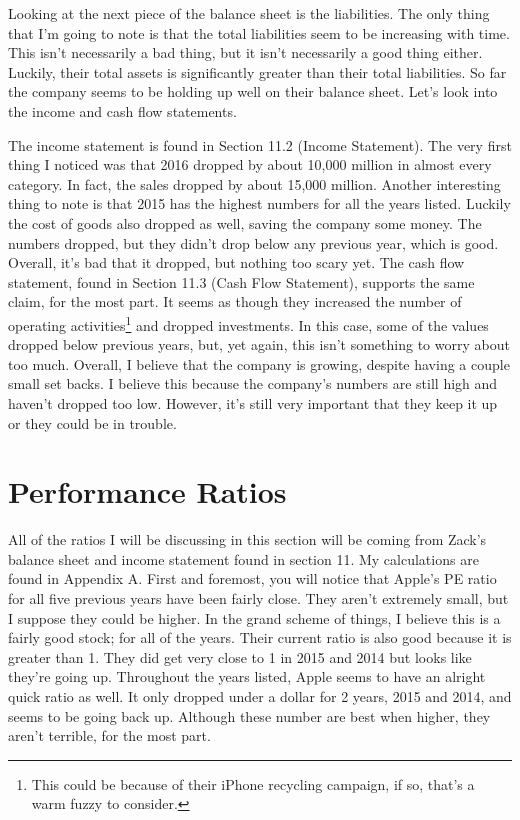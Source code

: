 \documentclass[12pt,a4paper,titlepage]{article}
\begin{document}
Looking at the next piece of the balance sheet is the liabilities. The only
thing that I'm going to note is that the total liabilities seem to be increasing
with time. This isn't necessarily a bad thing, but it isn't necessarily a good
thing either. Luckily, their total assets is significantly greater than their
total liabilities. So far the company seems to be holding up well on their
balance sheet. Let's look into the income and cash flow statements.

The income statement is found in Section 11.2 (Income Statement). The very first
thing I noticed was that 2016 dropped by about 10,000 million in almost every
category. In fact, the sales dropped by about 15,000 million. Another
interesting thing to note is that 2015 has the highest numbers for all the years
listed. Luckily the cost of goods also dropped as well, saving the company some
money. The numbers dropped, but they didn't drop below any previous year, which
is good. Overall, it's bad that it dropped, but nothing too scary yet. The cash
flow statement, found in Section 11.3 (Cash Flow Statement), supports the same
claim, for the most part. It seems as though they increased the number of
operating activities\footnote{This could be because of their iPhone recycling
  campaign, if so, that's a warm fuzzy to consider.} and dropped
investments. In this case, some of the values dropped below previous years,
but, yet again, this isn't something to worry about too much. Overall, I believe
that the company is growing, despite having a couple small set backs. I believe
this because the company's numbers are still high and haven't dropped too
low. However, it's still very important that they keep it up or they could be in
trouble.

\newpage

\section{Performance Ratios}
All of the ratios I will be discussing in this section will be coming from
Zack's balance sheet and income statement found in section 11. My calculations
are found in Appendix A. First and foremost, you will notice that Apple's PE
ratio for all five previous years have been fairly close. They aren't extremely
small, but I suppose they could be higher. In the grand scheme of things, I
believe this is a fairly good stock; for all of the years. Their current ratio
is also good because it is greater than 1. They did get very close to 1 in 2015
and 2014 but looks like they're going up. Throughout the years listed, Apple
seems to have an alright quick ratio as well. It only dropped under a dollar for
2 years, 2015 and 2014, and seems to be going back up. Although these number are
best when higher, they aren't terrible, for the most part.
\end{document}
